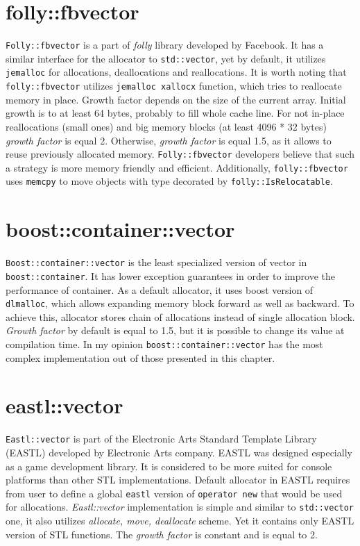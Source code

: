 \documentclass[inz, english, shortabstract]{iithesis}
\begin{document}

\section{folly::fbvector}
{\tt Folly::fbvector}\cite{folly::fbvector_impl} is a part of \emph{folly} library developed by Facebook. It has a similar interface for the allocator to {\tt std::vector}, yet by default, it utilizes {\tt jemalloc} for allocations, deallocations and reallocations\cite{folly::fbvector_description}. It is worth noting that {\tt folly::fbvector} utilizes {\tt jemalloc xallocx} function, which tries to reallocate memory in place. Growth factor depends on the size of the current array. Initial growth is to at least 64 bytes, probably to fill whole cache line. For not in-place reallocations (small ones) and big memory blocks (at least 4096 * 32 bytes) \emph{growth factor} is equal 2. Otherwise, \emph{growth factor} is equal 1.5, as it allows to reuse previously allocated memory. {\tt Folly::fbvector} developers believe that such a strategy is more memory friendly and efficient\cite{folly::fbvector_description}. Additionally, {\tt folly::fbvector} uses {\tt memcpy} to move objects with type decorated by {\tt folly::IsRelocatable}.

\section{boost::container::vector}
{\tt Boost::container::vector}\cite{boost::container::vector_impl} is the least specialized version of vector in {\tt boost::container}. It has lower exception guarantees in order to improve the performance of container\cite{boost_exceptions}. As a default allocator, it uses boost version of {\tt dlmalloc}\cite{dlmalloc}, which allows expanding memory block forward as well as backward. To achieve this, allocator stores chain of allocations instead of single allocation block. \emph{Growth factor} by default is equal to 1.5, but it is possible to change its value at compilation time. In my opinion {\tt boost::container::vector} has the most complex implementation out of those presented in this chapter.

\section{eastl::vector}
{\tt Eastl::vector}\cite{eastl::vector_impl} is part of the Electronic Arts Standard Template Library (EASTL) developed by Electronic Arts company. EASTL was designed especially as a game development library. It is considered to be more suited for console platforms\cite{eastl_faq} than other STL implementations. Default allocator in EASTL requires from user to define a global {\tt eastl} version of {\tt operator new} that would be used for allocations. {\it Eastl::vector} implementation is simple and similar to {\tt std::vector} one, it also utilizes \emph{allocate, move, deallocate} scheme. Yet it contains only EASTL version of STL functions. The \emph{growth factor} is constant and is equal to 2.  
\end{document}
